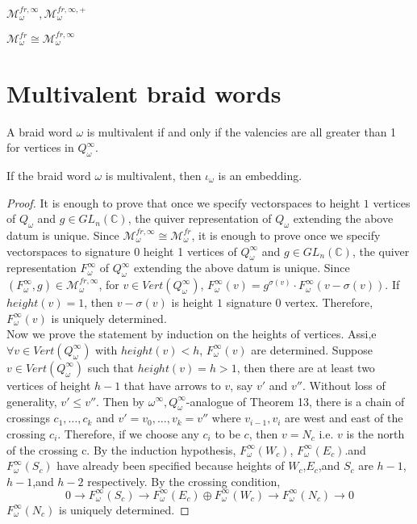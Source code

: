\begin{definition}
 $\mathcal{M}^{fr,\infty}_{\omega},\mathcal{M}^{fr,\infty,+}_{\omega}$
\end{definition}

\begin{theorem}
$\mathcal{M}^{fr}_{\omega}\cong\mathcal{M}^{fr,\infty}_{\omega}$ 
\end{theorem}

\section{Multivalent braid words}                            
\begin{definition}
 A braid word $\omega$ is multivalent if and only if the valencies are all greater than 1 for vertices in $Q_\omega^\infty$.
\end{definition}

\begin{theorem}
	If the braid word $\omega$ is multivalent, then $\iota_{\omega}$ is an embedding.
\end{theorem}
\begin{proof}
It is enough to prove that once we specify vectorspaces to height $1$ vertices of $Q_\omega$ and $g\in GL_n(\mathbb{C})$, the quiver representation of $Q_\omega$ extending the above datum is unique. Since $\mathcal{M}_\omega^{fr,\infty}\cong \mathcal{M}_\omega^{fr}$, it is enough to prove once we specify vectorspaces to signature 0 height 1 vertices of $Q_\omega^\infty$ and $g\in GL_n(\mathbb{C})$, the quiver representation $F_\omega^\infty$ of $Q_\omega^\infty$ extending the above datum is unique. Since $(F_\omega^\infty,g)\in \mathcal{M}_\omega^{fr,\infty}$, for $v\in Vert(Q_\omega^\infty)$, $F_\omega^\infty(v) = g^{\sigma(v)}\cdot F_\omega^\infty(v-\sigma(v))$. If $height(v)=1$, then $v-\sigma(v)$ is height $1$ signature $0$ vertex. Therefore, $F_\omega^\infty(v)$ is uniquely determined. \\
Now we prove the statement by induction on the heights of vertices. Assi,e $\forall v\in Vert(Q_\omega^\infty)$ with $height(v)<h$, $F_\omega^\infty(v)$ are determined. Suppose $v\in Vert(Q_\omega^\infty)$ such that $height(v)=h>1$, then there are at least two vertices of height $h-1$ that have arrows to $v$, say $v'$ and $v''$. Without loss of generality, $v'\leq v''$. Then by $\omega^\infty,Q_\omega^\infty$-analogue of Theorem 13, there is a chain of crossings $c_1,\dots,c_k$ and $v'=v_0,\dots,v_k=v''$ where $v_{i-1},v_i$ are west and east of the crossing $c_i$. Therefore, if we choose any $c_i$ to be $c$, then $v=N_c$ i.e. $v$ is the north of the crossing c. By the induction hypothesis, $F_\omega^\infty(W_c)$, $F_\omega^\infty(E_c)$.and $F_\omega^\infty(S_c)$ have already been specified because heights of $W_c$,$E_c$,and $S_c$ are $h-1$, $h-1$,and $h-2$ respectively. By the crossing condition,
\[
0\rightarrow F_\omega^\infty(S_c)\rightarrow F_\omega^\infty(E_c)\oplus F_\omega^\infty(W_c) \rightarrow F_\omega^\infty(N_c)\rightarrow 0
\]
$F_\omega^\infty(N_c)$ is uniquely determined.
\end{proof}

